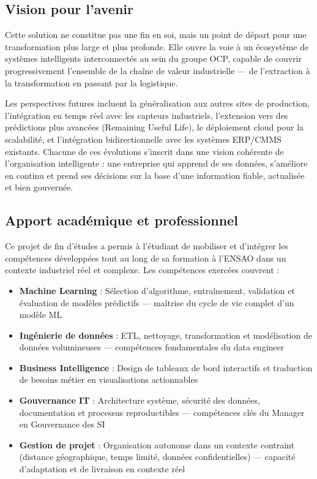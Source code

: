 \documentclass[a4paper,12pt]{report}
\begin{document}
\subsection{Vision pour l'avenir}

Cette solution ne constitue pas une fin en soi, mais un point de départ pour une transformation plus large et plus profonde. Elle ouvre la voie à un écosystème de systèmes intelligents interconnectés au sein du groupe OCP, capable de couvrir progressivement l'ensemble de la chaîne de valeur industrielle — de l'extraction à la transformation en passant par la logistique.

Les perspectives futures incluent la généralisation aux autres sites de production, l'intégration en temps réel avec les capteurs industriels, l'extension vers des prédictions plus avancées (Remaining Useful Life), le déploiement cloud pour la scalabilité, et l'intégration bidirectionnelle avec les systèmes ERP/CMMS existants. Chacune de ces évolutions s'inscrit dans une vision cohérente de l'organisation intelligente : une entreprise qui apprend de ses données, s'améliore en continu et prend ses décisions sur la base d'une information fiable, actualisée et bien gouvernée.

\subsection{Apport académique et professionnel}

Ce projet de fin d'études a permis à l'étudiant de mobiliser et d'intégrer les compétences développées tout au long de sa formation à l'ENSAO dans un contexte industriel réel et complexe. Les compétences exercées couvrent :

\begin{itemize}
    \item \textbf{Machine Learning} : Sélection d'algorithme, entraînement, validation et évaluation de modèles prédictifs — maîtrise du cycle de vie complet d'un modèle ML
    \item \textbf{Ingénierie de données} : ETL, nettoyage, transformation et modélisation de données volumineuses — compétences fondamentales du data engineer
    \item \textbf{Business Intelligence} : Design de tableaux de bord interactifs et traduction de besoins métier en visualisations actionnables
    \item \textbf{Gouvernance IT} : Architecture système, sécurité des données, documentation et processus reproductibles — compétences clés du Manager en Gouvernance des SI
    \item \textbf{Gestion de projet} : Organisation autonome dans un contexte contraint (distance géographique, temps limité, données confidentielles) — capacité d'adaptation et de livraison en contexte réel
\end{itemize}
\end{document}
